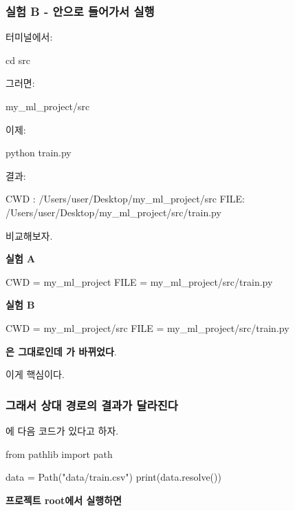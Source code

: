 \subsubsection{실험 B -  안으로 들어가서 실행}

터미널에서:

\begin{dhkzsh}
cd src
\end{dhkzsh}

그러면:

\begin{dhkzsh}
my_ml_project/src %
\end{dhkzsh}

이제:

\begin{dhkzsh}
python train.py
\end{dhkzsh}

결과:

\begin{dhkzsh}
CWD : /Users/user/Desktop/my_ml_project/src
FILE: /Users/user/Desktop/my_ml_project/src/train.py
\end{dhkzsh}

비교해보자.

\textbf{실험 A}

\begin{dhkzsh}
CWD = my_ml_project
FILE = my_ml_project/src/train.py
\end{dhkzsh}

\textbf{실험 B}

\begin{dhkzsh}
CWD = my_ml_project/src
FILE = my_ml_project/src/train.py
\end{dhkzsh}

\textbf{은 그대로인데 가 바뀌었다}.

이게 핵심이다.

\subsubsection{그래서 상대 경로의 결과가 달라진다}

에 다음 코드가 있다고 하자.

\begin{dhkcode}
from pathlib import path

data = Path("data/train.csv")
print(data.resolve())
\end{dhkcode}

\textbf{프로젝트 root에서 실행하면}


